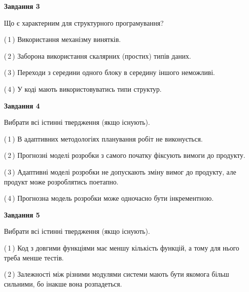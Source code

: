 \documentclass[10pt, ukrainian]{article}
\begin{document}
{\begin {large}
{\begin {center}\textbf{Завдання 3}\end {center}}\par
Що є характерним для структурного програмування?\par
\vspace{2mm}



(\,1\,) Використання механізму винятків. %



(\,2\,) Заборона використання скалярних (простих) типів даних. %



(\,3\,) Переходи з середини одного блоку в середину іншого неможливі. %



(\,4\,) У коді мають використовуватись типи структур. %


{\begin {center}\textbf{Завдання 4}\end {center}}\par
Вибрати всі істинні твердження (якщо існують).\par
\vspace{2mm}



(\,1\,) В адаптивних методологіях планування робіт не виконується. %



(\,2\,) Прогнозні моделі розробки з самого початку фіксують вимоги до продукту. %



(\,3\,) Адаптивні моделі розробки не допускають зміну вимог до продукту, але продукт може розроблятись поетапно. %



(\,4\,) Прогнозна модель розробки може одночасно бути інкрементною. %


{\begin {center}\textbf{Завдання 5}\end {center}}\par
Вибрати всі істинні твердження (якщо існують).\par
\vspace{2mm}



(\,1\,) Код з довгими функціями має меншу кількість функцій, а тому для нього треба менше тестів. %



(\,2\,) Залежності між різними модулями системи мають бути якомога більш сильними, бо інакше вона розпадеться. %




\end{large}}
\end{document}
